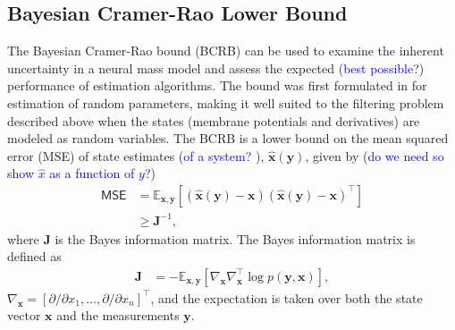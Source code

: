 \documentclass{article}
\renewcommand{\vec}[1]{\ensuremath{{\boldsymbol #1}}}
\newcommand{\brian}[1]{\textcolor{blue}{#1}}
\begin{document}
\subsection{Bayesian Cramer-Rao Lower Bound}
The Bayesian Cramer-Rao bound (BCRB) can be used to examine the inherent uncertainty in a neural mass model and assess the expected (\brian{best possible?}) performance of estimation algorithms. The bound was first formulated in \cite{VanTrees1968} for estimation of random parameters, making it well suited to the filtering problem described above when the states (membrane potentials and derivatives) are modeled as random variables. The BCRB is a lower bound on the mean squared error (MSE) of state estimates (\brian{of a system? }), $\hat{\mathbf{x}}\left(\mathbf{y}\right)$, given by (\brian{do we need so show $\hat x$ as a function of $y$?})
\begin{align}
	\mathsf{MSE} &= \mathbb E_{\mathbf{x},\mathbf{y}} \left[\left(\hat{\mathbf{x}}\left(\mathbf{y}\right) - \mathbf{x}\right) \left(\hat{\mathbf{x}}\left(\mathbf{y}\right) - \mathbf{x}\right)^{\top}\right] \nonumber \\
	& \ge \mathbf{J}^{-1},
	\label{eqn:mse_bound}
\end{align}
where $\mathbf{J}$ is the Bayes information matrix. The Bayes information matrix is defined as
\begin{align}
	\mathbf{J} &= -\mathbb E_{\mathbf{x},\mathbf{y}}\left[ \nabla_{\mathbf{x}}\nabla_{\mathbf{x}}^{\top} \log p(\mathbf{y},\mathbf{x}) \right],
	\label{eqn:bayes_matrix}
\end{align}
$\nabla_{\mathbf{x}} = [\partial/\partial x_1,\ldots,\partial/\partial x_n]^{\top}$, and the expectation is taken over both the state vector $\mathbf{x}$ and the measurements $\mathbf{y}$. %
\end{document}
